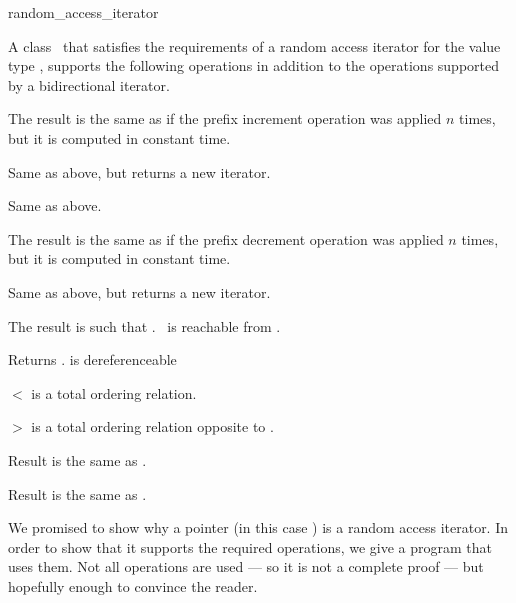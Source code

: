 \begin{ccClass}{random_access_iterator}


\ccDefinition

A class \ccClassName\ that satisfies the requirements of a random access
iterator for the value type , supports  the following operations
in addition to the operations supported by a bidirectional iterator.


\vfill

\ccOperations

{The result is the same as if the prefix increment operation 
 was applied $n$ times, but it is computed in constant time.}

{Same as above, but returns a new iterator.}

{Same as above.}

{The result is the same as if the prefix decrement operation 
 was applied $n$ times, but it is computed in constant time.}

{Same as above, but returns a new iterator.}

{The result  is such that   \ccVar.
 \ccPrecond \ccVar\ is reachable from .}

{Returns .
 \ccPrecond {} is dereferenceable}


{$<$ is a total ordering relation.}

{$>$ is a total ordering relation opposite to \ccStyle{<}.}

{Result is the same as  .}

{Result is the same as  .}

\vfill
\ccExample

We promised to show why a pointer (in this case ) is a random access
iterator. In order to show that it supports the required operations, we
give a program that uses them. Not all operations are used --- so it is not a
complete proof --- but hopefully enough to convince the reader.


\end{ccClass}
